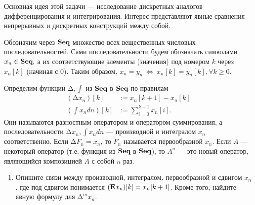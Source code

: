 
Основная идея этой задачи --- исследование дискретных аналогов дифференцирования и интегрирования. Интерес представляют явные сравнения непрерывных и дискретных конструкций между собой. 

Обозначим через $\text{\bfseries Seq}$ множество всех вещественных числовых последовательностей. Сами последовательности будем обозначать символами $x_n \in \text{\bfseries Seq},$ а их соответствующие элементы (значения) под номером $k$ через $x_n[k]$ (начиная с 0). Таким образом, $x_n = y_n \ \Longleftrightarrow \ x_n[k] = y_n[k], \forall k \geq 0$. 

Определим функции $\text{Δ}, \int$ из $\text{\bfseries Seq}$ в $\text{\bfseries Seq}$ по правилам 
\begin{align*}
(\text{Δ} x_n)[k] &:= x_n[k+1] - x_n[k] \\
\left(\int x_n dn\right) [k] &:= \sum_{i=0}^{k-1} x_n[i].
\end{align*}
Они называются разностным оператором и оператором суммирования, а последовательности $\text{Δ} x_n, \int x_n dn$ --- производной и интегралом $x_n$ соответственно. Если $\text{Δ} F_n = x_n$, то $F_n$ называется первообразной $x_n$. Если $A$ --- некоторый оператор (т.е. функция из $\text{\bfseries Seq}$ в $\text{\bfseries Seq}$), то $A^n$ --- это новый оператор, являющийся композицией $A$ с собой $n$ раз. 

\begin{enumerate}
\setcounter{enumi}{0}
\item Опишите связи между производной, интегралом, первообразной и сдвигом $x_n$, где под сдвигом понимается $(\text{\bfseries E}x_n)[k] = x_n[k+1]$. Кроме того, найдите явную формулу для $\text{Δ}^m x_n$.
\end{enumerate}

